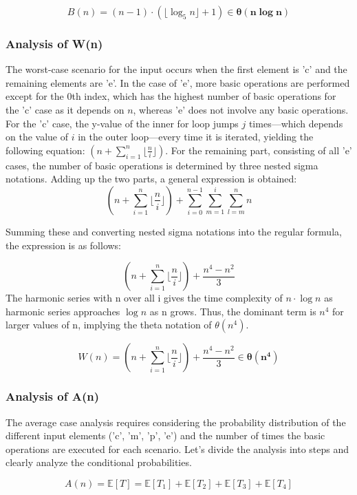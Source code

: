 \documentclass[11pt, oneside, a4paper]{article}
\begin{document}
\[
B(n) = (n-1) \cdot \left( \lfloor \log_5 n \rfloor + 1 \right) \in \boldsymbol{ \theta(n \log n) }
\]

	\subsubsection{Analysis of W(n)}
 The worst-case scenario for the input occurs when the first element is 'c' and the remaining elements are 'e'. In the case of 'e', more basic operations are performed except for the 0th index, which has the highest number of basic operations for the 'c' case as it depends on \( n \), whereas 'e' does not involve any basic operations. For the 'c' case, the y-value of the inner for loop jumps \( j \) times—which depends on the value of \( i \) in the outer loop—every time it is iterated, yielding the following equation: \(( n +  \sum_{i=1}^{n} \lfloor\frac{n}{i} \rfloor)\). For the remaining part, consisting of all 'e' cases, the number of basic operations is determined by three nested sigma notations. Adding up the two parts, a general expression is obtained:
\[
( n +  \sum_{i=1}^{n} \lfloor\frac{n}{i} \rfloor) +  \sum_{i=0}^{n-1} \sum_{m=1}^{i} \sum_{l=m}^{n} n
\]
 
 
 Summing these and converting nested sigma notations into the regular formula, the expression is as follows:

\begin{equation*}
\left( n +  \sum_{i=1}^{n} \lfloor\frac{n}{i} \rfloor \right) + \frac{n^4 - n^2}{3}
\end{equation*}
The harmonic series with n over all i gives the time complexity of $n \cdot\log n$ as harmonic series approaches $\log n$ as n grows.
Thus, the dominant term is $n^4$ for larger values of n, implying the theta notation of \( \theta(n^4) \).

\[
W(n) = \left( n +  \sum_{i=1}^{n} \lfloor\frac{n}{i} \rfloor \right) + \frac{n^4 - n^2}{3} \in \boldsymbol{\theta(n^4)}
\]

	
        \subsubsection{Analysis of A(n)}
The average case analysis requires considering the probability distribution of the different input elements ('c', 'm', 'p', 'e') and the number of times the basic operations are executed for each scenario. Let's divide the analysis into steps and clearly analyze the conditional probabilities.


 \[
A(n) = \mathbb{E}[T] = \mathbb{E}[T_1] + \mathbb{E}[T_2] + \mathbb{E}[T_3] + \mathbb{E}[T_4]
\]
\end{document}

